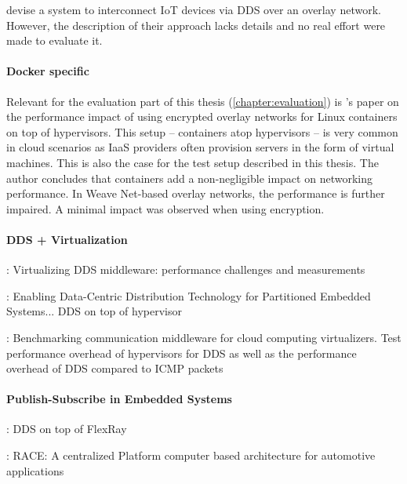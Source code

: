 \citeauthor*{hakiri2015publish} \cite{hakiri2015publish} devise a system to interconnect IoT devices via DDS over an overlay network. However, the description of their approach lacks details and no real effort were made to evaluate it.



\paragraph{Docker specific}

Relevant for the evaluation part of this thesis (\autoref{chapter:evaluation}) is \citeauthor*{kratzke2017microservices}'s paper \cite{kratzke2017microservices} on the performance impact of using encrypted overlay networks for Linux containers on top of hypervisors. This setup -- containers atop hypervisors -- is very common in cloud scenarios as IaaS providers often provision servers in the form of virtual machines. This is also the case for the test setup described in this thesis. The author concludes that containers add a non-negligible impact on networking performance. In Weave Net-based overlay networks, the performance is further impaired. A minimal impact was observed when using encryption.



\paragraph{DDS + Virtualization}
\cite{serrano2013virtualizing}: Virtualizing DDS middleware: performance challenges and measurements

\cite{perez:gutierrez:ieeetpds16}: Enabling Data-Centric Distribution Technology for Partitioned Embedded Systems... DDS on top of hypervisor

\cite{garcia2013benchmarking}: Benchmarking communication middleware for cloud computing virtualizers. Test performance overhead of hypervisors for DDS as well as the performance overhead of DDS compared to ICMP packets

\paragraph{Publish-Subscribe in Embedded Systems}

\cite{bouhouch2013dds}: DDS on top of FlexRay

\cite{sommer2013race}: RACE: A centralized Platform computer based architecture for automotive applications


